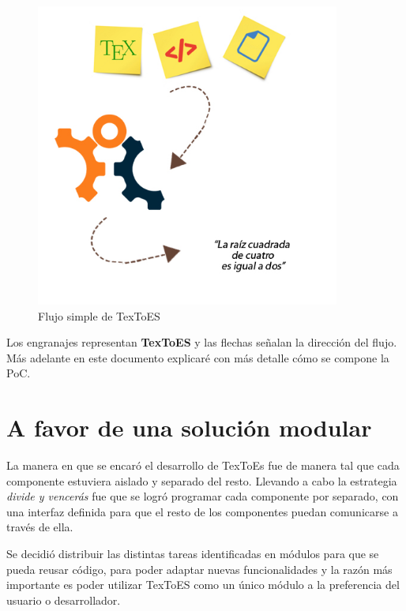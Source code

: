 \begin{figure}[H]
\centering
	\includegraphics[width=10cm, height=10cm]{Figures/arquitectura-general-textoes}
	\caption[]{Flujo simple de TexToES}
\label{fig:arquitectura}
\end{figure}

Los engranajes representan \textbf{TexToES} y las flechas señalan la dirección del flujo. Más adelante en este documento explicaré con más detalle cómo se compone la PoC.


\section{A favor de una solución modular}

La manera en que se encaró el desarrollo de TexToEs fue de manera tal que cada componente estuviera aislado y separado del resto.
Llevando a cabo la estrategia \textit{divide y vencerás} fue que se logró programar cada componente por separado, con una interfaz definida para que el resto de los componentes puedan comunicarse a través de ella.

Se decidió distribuir las distintas tareas identificadas en módulos para que se pueda reusar código, para poder adaptar nuevas funcionalidades y la razón más importante es poder utilizar TexToES como un único módulo a la preferencia del usuario o desarrollador.
\\[1cm]

